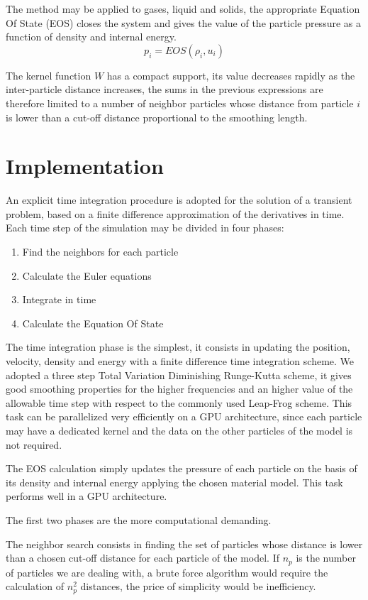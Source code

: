 \documentclass[a4paper, 11pt, twocolumn]{article}
\begin{document}
The method may be applied to gases, liquid and solids, the appropriate Equation Of State (EOS) closes the system and gives the value of the particle pressure as a function of density and internal energy.
\begin{equation}
p_i=EOS(\rho_i, u_i)
\end{equation}

The kernel function $W$ has a compact support, its value decreases rapidly as the inter-particle distance increases, the sums in the previous expressions are therefore limited to a number of neighbor particles whose distance from particle $i$ is lower than a cut-off distance proportional to the smoothing length.

\section{Implementation}

An explicit time integration procedure is adopted for the solution of a transient problem, based on a finite difference approximation of the derivatives in time. Each time step of the simulation may be divided in four phases:
\begin{enumerate}
\item Find the neighbors for each particle
\item Calculate the Euler equations
\item Integrate in time
\item Calculate the Equation Of State
\end{enumerate}

The time integration phase is the simplest, it consists in updating the position, velocity, density and energy with a finite difference time integration scheme. We adopted a three step Total Variation Diminishing Runge-Kutta scheme, it gives good smoothing properties for the higher frequencies and an higher value of the allowable time step with respect to the commonly used Leap-Frog scheme. This task can be parallelized very efficiently on a GPU architecture, since each particle may have a dedicated kernel and the data on the other particles of the model is not required.

The EOS calculation simply updates the pressure of each particle on the basis of its density and internal energy applying the chosen material model. This task performs well in a GPU architecture.

The first two phases are the more computational demanding.

The neighbor search consists in finding the set of particles whose distance is lower than a chosen cut-off distance for each particle of the model. If $n_p$ is the number of particles we are dealing with, a brute force algorithm would require the calculation of $n_p^2$ distances, the price of simplicity would be inefficiency. 
\end{document}
